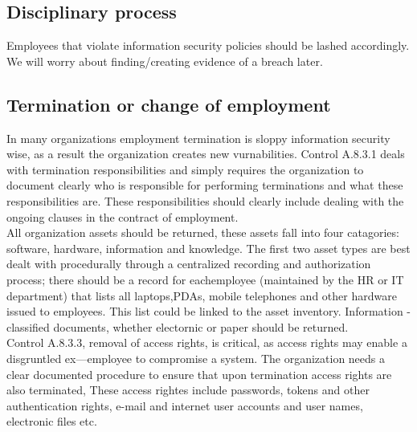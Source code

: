 \subsection{Disciplinary process}
Employees that violate information security policies should be lashed 
accordingly. We will worry about finding/creating evidence of a breach later.

\subsection{Termination or change of employment}
In many organizations employment termination is sloppy information security 
wise, as a result the organization creates new vurnabilities. 
Control A.8.3.1 deals with termination responsibilities and simply requires
the organization to document clearly who is responsible for performing
terminations and what these responsibilities are. These responsibilities should
clearly include dealing with the ongoing clauses in the contract of employment.\\

All organization assets should be returned, these assets fall into four 
catagories: software, hardware, information and knowledge.
The first two asset types are best dealt with procedurally through a centralized
recording and authorization process; there should be a record for eachemployee 
(maintained by the HR or IT department) that lists all laptops,PDAs, mobile 
telephones and other hardware issued to employees. This list could be linked to 
the asset inventory. Information - classified documents, whether electornic or 
paper should be returned.\\

Control A.8.3.3, removal of access rights, is critical, as access rights may
enable a disgruntled ex—employee to compromise a system. The organization needs
a clear documented procedure to ensure that upon termination access rights are 
also terminated, These access rightes include passwords, tokens and other 
authentication rights, e-mail and internet user accounts and user names, 
electronic files etc.

